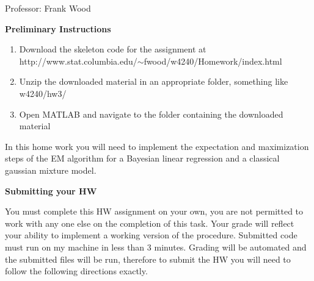 \documentclass[12pt]{article}
\begin{document}

\begin{center}
	Professor: Frank Wood
\end{center}


{\bf Preliminary Instructions}

\begin{enumerate}
	\item Download the skeleton code for the assignment at \\  http://www.stat.columbia.edu/$\sim$fwood/w4240/Homework/index.html
	\item Unzip the downloaded material in an appropriate folder, something like w4240/hw3/
	\item Open MATLAB and navigate to the folder containing the downloaded material
\end{enumerate}

In this home work you will need to implement the expectation and maximization steps of the EM algorithm for a Bayesian linear regression and a classical gaussian mixture model.\\






{\bf Submitting your HW}

You must complete this HW assignment on your own, you are not permitted to work with any one else on the completion of this task.  Your grade will reflect your ability to implement a working version of the procedure.  Submitted code must run on my machine in less than 3 minutes.  Grading will be automated and the submitted files will be run, therefore to submit the HW you will need to follow the following directions exactly.
\end{document}
